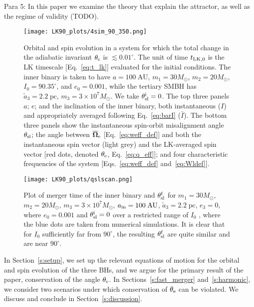 \documentclass[
        twocolumn,
        twocolappendix
    ]{aastex63}
\renewcommand*{\bm}[1]{\boldsymbol{\mathbf{#1}}}
\begin{document}
Para 5: In this paper we examine the theory that explain the attractor, as well
as the regime of validity (TODO).

\begin{figure*}
    \centering
    \texttt{[image: LK90\_plots/4sim\_90\_350.png]}
    \caption{Orbital and spin evolution in a system for which the total change
    in the adiabatic invariant $\theta_{\rm e}$ is $\lesssim 0.01^\circ$. The
    unit of time $t_{\rm LK, 0}$ is the LK timescale [Eq.~\eqref{eq:t_lk}]
    evaluated for the initial conditions. The inner binary is taken to have $a =
    100\;\mathrm{AU}$, $m_1 = 30M_{\odot}$, $m_2 = 20M_{\odot}$, $I_0 =
    90.35^\circ$, and $e_0 = 0.001$, while the tertiary SMBH has $\tilde{a}_3 =
    2.2\;\mathrm{pc}$, $m_3 = 3 \times 10^7 M_{\odot}$. We take $\theta_{\rm
    sl}^{\rm i} = 0$. The top three panels $a$; $e$; and the inclination of the
    inner binary, both instantaneous ($I$) and appropriately averaged following
    Eq.~\eqref{eq:barI} ($\bar{I}$). The bottom three panels show the
    instantaneous spin-orbit misalignment angle $\theta_{\rm sl}$; the angle
    between $\bm{\overline{\Omega}}_{\rm e}$ [Eq.~\eqref{eq:weff_def}] and both
    the instantaneous spin vector (light grey) and the LK-averaged spin vector
    [red dots, denoted $\theta_{\rm e}$, Eq.~\eqref{eq:q_eff}]; and four
    characteristic frequencies of the system [Eqs.~\ref{eq:weff_def}
    and~\eqref{eq:Wldef}].}\label{fig:4sim_90_350}
\end{figure*}
\begin{figure}
    \centering
    \texttt{[image: LK90\_plots/qslscan.png]}
    \caption{Plot of merger time of the inner binary and $\theta_{\rm sl}^{\rm
    f}$ for $m_1 = 30M_{\odot}$, $m_2 = 20M_{\odot}$, $m_3 = 3 \times 10^7
    M_{\odot}$, $a_{\rm in} = 100\;\mathrm{AU}$, $\tilde{a}_3 =
    2.2\;\mathrm{pc}$, $e_3 = 0$, where $e_0 = 0.001$ and $\theta_{\rm sl}^{\rm
    i} = 0$ over a restricted range of $I_0$ \citep[analogous to the bottom-most
    panel in Fig.~3 of][]{bin2}, where the blue dots are taken from numerical
    simulations. It is clear that for $I_0$ sufficiently far from $90^\circ$,
    the resulting $\theta_{\rm sl}^{\rm f}$ are quite similar and are near
    $90^\circ$\citep{bin2}.}\label{fig:qslscan}
\end{figure}

In Section~\ref{s:setup}, we set up the relevant equations of motion for the
orbital and spin evolution of the three BHs, and we argue for the primary result
of the paper, conservation of the angle $\theta_{\rm e}$. In
Sections~\ref{s:fast_merger} and~\ref{s:harmonic}, we consider two scenarios
under which conservation of $\theta_{\rm e}$ can be violated. We discuss and
conclude in Section~\ref{s:discussion}.
\end{document}
